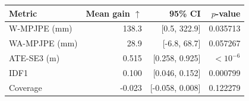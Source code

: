 \begin{tabular}{lrrr}
\toprule
Metric & Mean gain $\uparrow$ & 95\% CI & $p$-value \\
\midrule
W-MPJPE (mm) & 138.3 & [0.5, 322.9] & 0.035713 \\
WA-MPJPE (mm) & 28.9 & [-6.8, 68.7] & 0.057267 \\
ATE-SE3 (m) & 0.515 & [0.258, 0.925] & $<10^{-6}$ \\
IDF1 & 0.100 & [0.046, 0.152] & 0.000799 \\
Coverage & -0.023 & [-0.058, 0.008] & 0.122279 \\
\bottomrule
\end{tabular}
